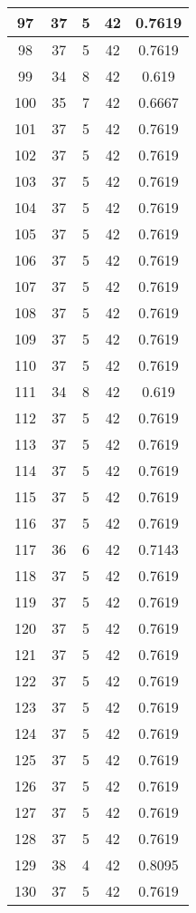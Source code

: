\documentclass[letterpaper, 12pt]{article}
\begin{document}
\begin{longtable}{|c|c|c|c|c|}
\hline
97 & 37 & 5 & 42 & 0.7619 \\
\hline
98 & 37 & 5 & 42 & 0.7619 \\
\hline
99 & 34 & 8 & 42 & 0.619 \\
\hline
100 & 35 & 7 & 42 & 0.6667 \\
\hline
101 & 37 & 5 & 42 & 0.7619 \\
\hline
102 & 37 & 5 & 42 & 0.7619 \\
\hline
103 & 37 & 5 & 42 & 0.7619 \\
\hline
104 & 37 & 5 & 42 & 0.7619 \\
\hline
105 & 37 & 5 & 42 & 0.7619 \\
\hline
106 & 37 & 5 & 42 & 0.7619 \\
\hline
107 & 37 & 5 & 42 & 0.7619 \\
\hline
108 & 37 & 5 & 42 & 0.7619 \\
\hline
109 & 37 & 5 & 42 & 0.7619 \\
\hline
110 & 37 & 5 & 42 & 0.7619 \\
\hline
111 & 34 & 8 & 42 & 0.619 \\
\hline
112 & 37 & 5 & 42 & 0.7619 \\
\hline
113 & 37 & 5 & 42 & 0.7619 \\
\hline
114 & 37 & 5 & 42 & 0.7619 \\
\hline
115 & 37 & 5 & 42 & 0.7619 \\
\hline
116 & 37 & 5 & 42 & 0.7619 \\
\hline
117 & 36 & 6 & 42 & 0.7143 \\
\hline
118 & 37 & 5 & 42 & 0.7619 \\
\hline
119 & 37 & 5 & 42 & 0.7619 \\
\hline
120 & 37 & 5 & 42 & 0.7619 \\
\hline
121 & 37 & 5 & 42 & 0.7619 \\
\hline
122 & 37 & 5 & 42 & 0.7619 \\
\hline
123 & 37 & 5 & 42 & 0.7619 \\
\hline
124 & 37 & 5 & 42 & 0.7619 \\
\hline
125 & 37 & 5 & 42 & 0.7619 \\
\hline
126 & 37 & 5 & 42 & 0.7619 \\
\hline
127 & 37 & 5 & 42 & 0.7619 \\
\hline
128 & 37 & 5 & 42 & 0.7619 \\
\hline
129 & 38 & 4 & 42 & 0.8095 \\
\hline
130 & 37 & 5 & 42 & 0.7619 \\

\end{longtable}
\end{document}
